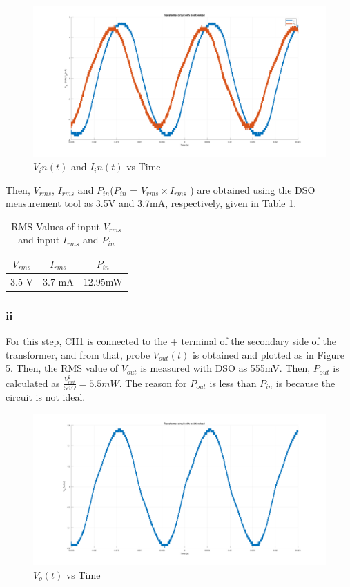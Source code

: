 \documentclass[letterpaper,12pt]{article}
\begin{document}
\begin{figure}[H]
    \centering
    \includegraphics[width = 1\textwidth]{2_1.png}
    \caption{\(V_in(t) \) and \(I_in(t)\) vs Time}
\end{figure} 
Then, \(V_{rms}\), \(I_{rms}\) and \(P_{in}\)(\(P_{in}\) = \(V_{rms} \times\)\(I_{rms}\) )  are obtained using the DSO measurement tool as 3.5V and 3.7mA, respectively, given in Table 1.
\begin{table}[H]
    \begin{center}
        \caption{RMS Values of input \(V_{rms}\) and input \(I_{rms}\) and \(P_{in}\)}
        \vspace{2mm}
        \begin{tabular}{||c | c | c ||} 
            \hline
            \(V_{rms}\) & \(I_{rms}\) & \(P_{in}\) \\ [0.5ex] 
            \hline\hline
            3.5 V & 3.7 mA & 12.95mW   \\
            \hline
        \end{tabular}
    \end{center}
\end{table}

\subsubsection{ii}
For this step, CH1 is connected to the + terminal of the secondary side of the transformer, and from that, probe \(V_{out}(t)\) is obtained and plotted as in Figure 5. Then, the RMS value of \(V_{out}\) is measured with DSO as 555mV. Then, \(P_{out}\) is calculated as \(\frac{V_{out}^2}{56\Omega } = 5.5mW\). The reason for \(P_{out}\) is less than \(P_{in}\) is because the circuit is not ideal.
\begin{figure}[H]
    \centering
    \includegraphics[width = 1\textwidth]{2_2.png}
    \caption{\(V_o(t) \) vs Time}
\end{figure} 
\end{document}
